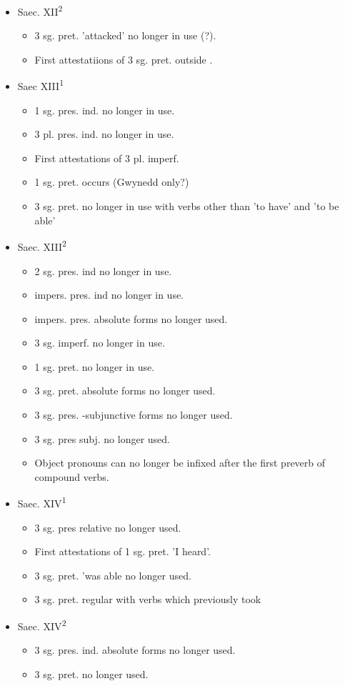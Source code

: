 \begin{itemize}
\item Saec. XII\textsuperscript{2}
    \begin{itemize}
    \item 3 sg. pret.  'attacked' no longer in use (?).
    \item First attestatiions of 3 sg. pret.  outside .
    \end{itemize}
\item Saec XIII\textsuperscript{1}
    \begin{itemize}
    \item 1 sg. pres. ind.  no longer in use.
    \item 3 pl. pres. ind.  no longer in use.
    \item First attestations of 3 pl. imperf. 
    \item 1 sg. pret.  occurs (Gwynedd only?)
    \item 3 sg. pret.  no longer in use with verbs other than  'to have' and  'to be able'
    \end{itemize}
\item Saec. XIII\textsuperscript{2}
    \begin{itemize}
    \item 2 sg. pres. ind  no longer in use.
    \item impers. pres. ind  no longer in use.
    \item impers. pres. absolute forms no longer used.
    \item 3 sg. imperf.  no longer in use.
    \item 1 sg. pret.  no longer in use.
    \item 3 sg. pret. absolute forms no longer used.
    \item 3 sg. pres. -subjunctive forms no longer used.
    \item 3 sg. pres subj.  no longer used.
    \item Object pronouns can no longer be infixed after the first preverb of compound verbs.
    \end{itemize}
\item Saec. XIV\textsuperscript{1}
    \begin{itemize}
    \item 3 sg. pres relative  no longer used.
    \item First attestations of 1 sg. pret.  'I heard'. 
    \item 3 sg. pret.  'was able  no longer used.
    \item 3 sg. pret.  regular with verbs which previously took 
    \end{itemize}
\item Saec. XIV\textsuperscript{2}
    \begin{itemize}
    \item 3 sg. pres. ind. absolute forms no longer used.
    \item 3 sg. pret.  no longer used.
    \end{itemize}
\end{itemize}
